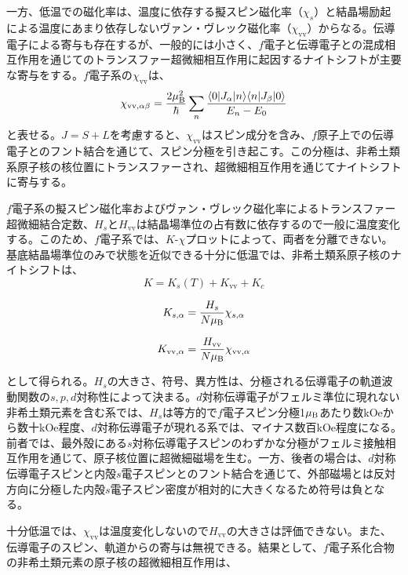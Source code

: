 \documentclass[11pt,a4j]{jreport}
\begin{document}
一方、低温での磁化率は、温度に依存する擬スピン磁化率（$\chi_s$）と結晶場励起による温度にあまり依存しないヴァン・ヴレック磁化率（$\chi_{\text{vv}}$）からなる。伝導電子による寄与も存在するが、一般的には小さく、$f$電子と伝導電子との混成相互作用を通じてのトランスファー超微細相互作用に起因するナイトシフトが主要な寄与をする。$f$電子系の$\chi_{\text{vv}}$は、
\begin{equation}
  \chi_{\text{vv}, \alpha \beta} = \frac{2 \mu_{\text B}^2}{\hbar} \sum_{n} \frac{\langle 0 | J_{\alpha} | n \rangle \langle n | J_{\beta} | 0 \rangle}{E_n - E_0}
\end{equation}
と表せる。$J = S + L$を考慮すると、$\chi_{\text{vv}}$はスピン成分を含み、$f$原子上での伝導電子とのフント結合を通じて、スピン分極を引き起こす。この分極は、非希土類系原子核の核位置にトランスファーされ、超微細相互作用を通じてナイトシフトに寄与する。

$f$電子系の擬スピン磁化率およびヴァン・ヴレック磁化率によるトランスファー超微細結合定数、$H_s$と$H_{\text{vv}}$は結晶場準位の占有数に依存するので一般に温度変化する。このため、$f$電子系では、$K$-$\chi$プロットによって、両者を分離できない。基底結晶場準位のみで状態を近似できる十分に低温では、非希土類系原子核のナイトシフトは、
\begin{equation}
K = K_s(T) + K_{\text{vv}} + K_c
\end{equation}

\begin{equation}
K_{s, \alpha} = \frac{H_s}{N \mu_{\text B}} \chi_{s, \alpha}
\end{equation}

\begin{equation}
K_{\text{vv}, \alpha} = \frac{H_{\text{vv}}}{N \mu_{\text B}} \chi_{\text{vv}, \alpha}
\end{equation}

として得られる。$H_s$の大きさ、符号、異方性は、分極される伝導電子の軌道波動関数の$s, p, d$対称性によって決まる。$d$対称伝導電子がフェルミ準位に現れない非希土類元素を含む系では、$H_s$は等方的で$f$電子スピン分極1$\mu_{\text B}$あたり数kOeから数十kOe程度、$d$対称伝導電子が現れる系では、マイナス数百kOe程度になる。前者では、最外殻にある$s$対称伝導電子スピンのわずかな分極がフェルミ接触相互作用を通じて、原子核位置に超微細磁場を生む。一方、後者の場合は、$d$対称伝導電子スピンと内殻$s$電子スピンとのフント結合を通じて、外部磁場とは反対方向に分極した内殻$s$電子スピン密度が相対的に大きくなるため符号は負となる。

十分低温では、$\chi_{\text{vv}}$は温度変化しないので$H_{\text{vv}}$の大きさは評価できない。また、伝導電子のスピン、軌道からの寄与は無視できる。結果として、$f$電子系化合物の非希土類元素の原子核の超微細相互作用は、
\end{document}
